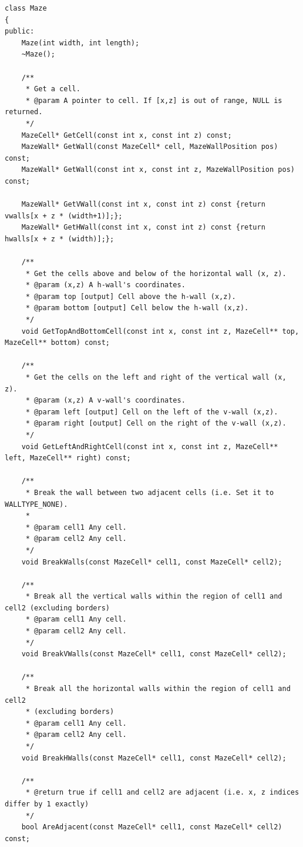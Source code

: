\begin{lstlisting}[caption= The \texttt{Maze} class]
class Maze
{
public:
    Maze(int width, int length);
    ~Maze();
    
    /**
     * Get a cell.
     * @param A pointer to cell. If [x,z] is out of range, NULL is returned.
     */
    MazeCell* GetCell(const int x, const int z) const;
    MazeWall* GetWall(const MazeCell* cell, MazeWallPosition pos) const;
    MazeWall* GetWall(const int x, const int z, MazeWallPosition pos) const;
    
    MazeWall* GetVWall(const int x, const int z) const {return vwalls[x + z * (width+1)];};
    MazeWall* GetHWall(const int x, const int z) const {return hwalls[x + z * (width)];};
    
    /**
     * Get the cells above and below of the horizontal wall (x, z).
     * @param (x,z) A h-wall's coordinates.
     * @param top [output] Cell above the h-wall (x,z).
     * @param bottom [output] Cell below the h-wall (x,z).
     */
    void GetTopAndBottomCell(const int x, const int z, MazeCell** top, MazeCell** bottom) const;
    
    /**
     * Get the cells on the left and right of the vertical wall (x, z).
     * @param (x,z) A v-wall's coordinates.
     * @param left [output] Cell on the left of the v-wall (x,z).
     * @param right [output] Cell on the right of the v-wall (x,z).
     */
    void GetLeftAndRightCell(const int x, const int z, MazeCell** left, MazeCell** right) const;
    
    /**
     * Break the wall between two adjacent cells (i.e. Set it to WALLTYPE_NONE).
     *
     * @param cell1 Any cell.
     * @param cell2 Any cell.
     */
    void BreakWalls(const MazeCell* cell1, const MazeCell* cell2);
    
    /**
     * Break all the vertical walls within the region of cell1 and cell2 (excluding borders)
     * @param cell1 Any cell.
     * @param cell2 Any cell.
     */
    void BreakVWalls(const MazeCell* cell1, const MazeCell* cell2);
    
    /**
     * Break all the horizontal walls within the region of cell1 and cell2 
     * (excluding borders)
     * @param cell1 Any cell.
     * @param cell2 Any cell.
     */
    void BreakHWalls(const MazeCell* cell1, const MazeCell* cell2);
    
    /**
     * @return true if cell1 and cell2 are adjacent (i.e. x, z indices differ by 1 exactly)
     */
    bool AreAdjacent(const MazeCell* cell1, const MazeCell* cell2) const;
    

\end{lstlisting}
